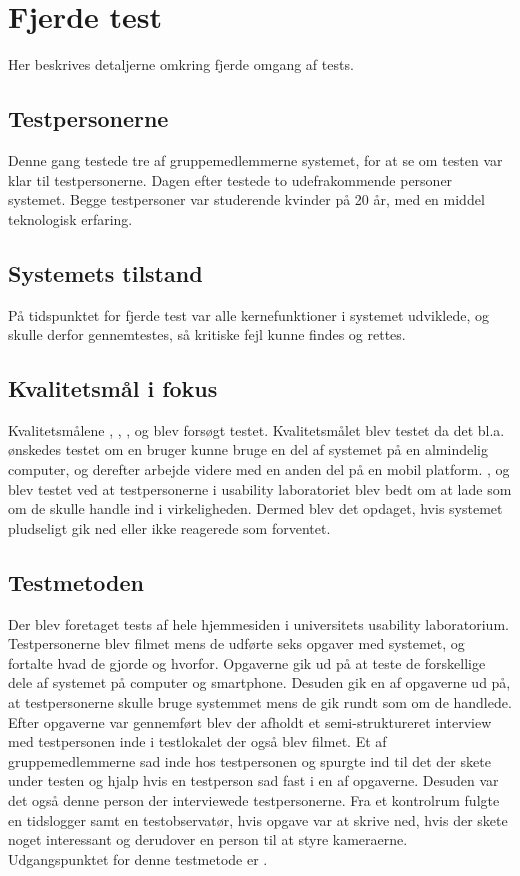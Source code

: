 \section{Fjerde test}
Her beskrives detaljerne omkring fjerde omgang af tests.

\subsection{Testpersonerne}
Denne gang testede tre af gruppemedlemmerne systemet, for at se om testen var klar til testpersonerne. Dagen efter testede to udefrakommende personer systemet. Begge testpersoner var studerende kvinder på 20 år, med en middel teknologisk erfaring.


\subsection{Systemets tilstand}
På tidspunktet for fjerde test var alle kernefunktioner i systemet udviklede, og skulle derfor gennemtestes, så kritiske fejl kunne findes og rettes. 

\subsection{Kvalitetsmål i fokus}
Kvalitetsmålene , , ,  og  blev forsøgt testet. Kvalitetsmålet  blev testet da det bl.a. ønskedes testet om en bruger kunne bruge en del af systemet på en almindelig computer, og derefter arbejde videre med en anden del på en mobil platform. ,  og  blev testet ved at testpersonerne i usability laboratoriet blev bedt om at lade som om de skulle handle ind i virkeligheden. Dermed blev det opdaget, hvis systemet pludseligt gik ned eller ikke reagerede som forventet. 

\subsection{Testmetoden}
Der blev foretaget tests af hele hjemmesiden i universitets usability laboratorium. Testpersonerne blev filmet mens de udførte seks opgaver med systemet, og fortalte hvad de gjorde og hvorfor. Opgaverne gik ud på at teste de forskellige dele af systemet på computer og smartphone. Desuden gik en af opgaverne ud på, at testpersonerne skulle bruge systemmet mens de gik rundt som om de handlede. Efter opgaverne var gennemført blev der afholdt et semi-struktureret interview med testpersonen inde i testlokalet der også blev filmet. Et af gruppemedlemmerne sad inde hos testpersonen og spurgte ind til det der skete under testen og hjalp hvis en testperson sad fast i en af opgaverne. Desuden var det også denne person der interviewede testpersonerne. Fra et kontrolrum fulgte en tidslogger samt en testobservatør, hvis opgave var at skrive ned, hvis der skete noget interessant og derudover en person til at styre kameraerne. Udgangspunktet for denne testmetode er \citep{DEBUL}.

